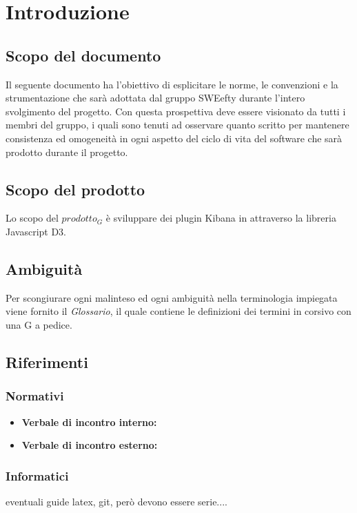 \section{Introduzione}

\subsection{Scopo del documento}
Il seguente documento ha l'obiettivo di esplicitare le norme, le convenzioni e la strumentazione che sarà adottata dal gruppo SWEefty durante l'intero svolgimento del progetto. Con questa prospettiva deve essere visionato da tutti i membri del gruppo, i quali sono tenuti ad osservare quanto scritto per mantenere consistenza ed omogeneità in ogni aspetto del ciclo di vita del software che sarà prodotto durante il progetto.
\subsection{Scopo del prodotto}
Lo scopo del $prodotto_G$ è sviluppare dei plugin Kibana in attraverso la libreria Javascript D3.

\subsection{Ambiguità}
Per scongiurare ogni malinteso ed ogni ambiguità nella terminologia impiegata viene fornito il \textit{Glossario}, il quale contiene le definizioni dei termini in corsivo con una G a pedice.

\subsection{Riferimenti}
	\subsubsection{Normativi}
		\begin{itemize}
			\item \textbf{Verbale di incontro interno:}
			\item \textbf{Verbale di incontro esterno:}		
		\end{itemize}
	\subsubsection{Informatici}
	eventuali guide latex, git, però devono essere serie....